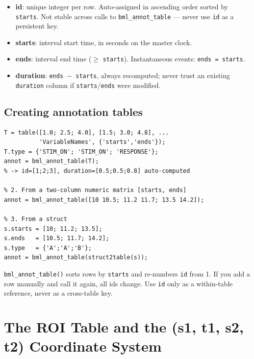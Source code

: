 \documentclass[11pt, a4paper]{article}
\begin{document}
\begin{itemize}[noitemsep]
  \item \textbf{id}: unique integer per row. Auto-assigned in ascending order sorted by \texttt{starts}. Not stable across calls to \texttt{bml\_annot\_table} --- never use \texttt{id} as a persistent key.
  \item \textbf{starts}: interval start time, in seconds on the master clock.
  \item \textbf{ends}: interval end time ($\geq$ \texttt{starts}). Instantaneous events: \texttt{ends = starts}.
  \item \textbf{duration}: \texttt{ends $-$ starts}, always recomputed; never trust an existing \texttt{duration} column if \texttt{starts}/\texttt{ends} were modified.
\end{itemize}

\subsection{Creating annotation tables}

\begin{lstlisting}[style=matlab, caption={Three ways to call bml\_annot\_table}]
% 1. From a table with starts and ends columns
T = table([1.0; 2.5; 4.0], [1.5; 3.0; 4.8], ...
          'VariableNames', {'starts','ends'});
T.type = {'STIM_ON'; 'STIM_ON'; 'RESPONSE'};
annot = bml_annot_table(T);
% -> id=[1;2;3], duration=[0.5;0.5;0.8] auto-computed

% 2. From a two-column numeric matrix [starts, ends]
annot = bml_annot_table([10 10.5; 11.2 11.7; 13.5 14.2]);

% 3. From a struct
s.starts = [10; 11.2; 13.5];
s.ends   = [10.5; 11.7; 14.2];
s.type   = {'A';'A';'B'};
annot = bml_annot_table(struct2table(s));
\end{lstlisting}

\begin{warnbox}
  \texttt{bml\_annot\_table()} sorts rows by \texttt{starts} and re-numbers \texttt{id} from 1. If you add a row manually and call it again, all ids change. Use \texttt{id} only as a within-table reference, never as a cross-table key.
\end{warnbox}

\section{The ROI Table and the (s1, t1, s2, t2) Coordinate System}
\label{sec:roi}
\end{document}
